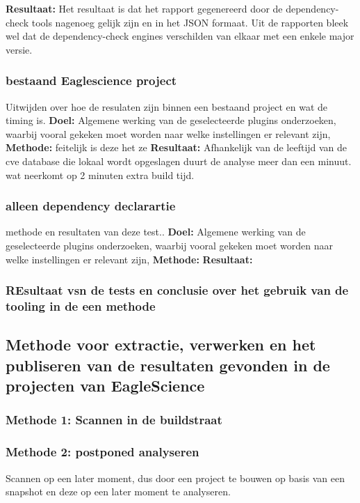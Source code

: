 \textbf{Resultaat:} Het resultaat is dat het rapport gegenereerd door de dependency-check tools nagenoeg gelijk zijn en in het JSON formaat. Uit de rapporten bleek wel dat de dependency-check engines verschilden van elkaar met een enkele major versie.
\subsubsection{bestaand Eaglescience project} Uitwijden over hoe de resulaten zijn binnen een bestaand project en wat de timing is.
\textbf{Doel:} Algemene werking van de geselecteerde plugins onderzoeken, waarbij vooral gekeken moet worden naar welke instellingen er relevant zijn,
\textbf{Methode:} feitelijk is deze het ze
\textbf{Resultaat:} Afhankelijk van de leeftijd van de cve database die lokaal wordt opgeslagen duurt de analyse meer dan een minuut. wat neerkomt op 2 minuten extra build tijd.

\subsubsection{alleen dependency declarartie} methode en resultaten van deze test..
\textbf{Doel:} Algemene werking van de geselecteerde plugins onderzoeken, waarbij vooral gekeken moet worden naar welke instellingen er relevant zijn,
\textbf{Methode:}
\textbf{Resultaat:}


\subsubsection{REsultaat vsn de tests en conclusie over het gebruik van de tooling in de een methode}



\subsection{Methode voor extractie, verwerken en het publiseren van de resultaten gevonden in de projecten van EagleScience}\label{subsec:methodeSOUPES}

\subsubsection{Methode 1: Scannen in de buildstraat}

\subsubsection{Methode 2: postponed analyseren}
Scannen op een later moment, dus door een project te bouwen op basis van een snapshot en deze op een later moment te analyseren.


